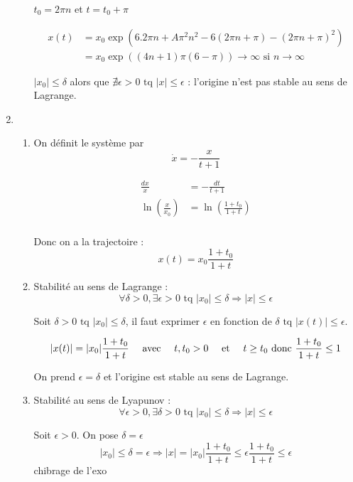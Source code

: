 \documentclass{../../td}{subfiles}
\begin{document}
\begin{enumerate}
\begin{enumerate}
$t_0=2\pi n$ et $t=t_0 + \pi$

\begin{align*}
x(t) & = x_0 \exp(6.2\pi n + A\pi^2 n^2 - 6(2\pi n + \pi) - (2\pi n + \pi)^2) \\
& = x_0\exp((4n+1)\pi(6-\pi)) \to \infty \text{ si } n \to \infty
\end{align*}

$|x_0| \leq \delta$ alors que $\nexists \epsilon > 0 \text{ tq } |x| \leq \epsilon$ : l'origine n'est pas stable au sens de Lagrange.


\end{enumerate}

\item \begin{enumerate}\renewcommand{\theenumi}{\alph{enumi}}\setlength{\itemsep}{8mm}
\item On définit le système par
\[ \dot{x} = -\frac{x}{t+1} \]

\begin{align*}
\frac{dx}{x} & = - \frac{dt}{t+1} \\
\ln(\frac{x}{x_0})  & = \ln(\frac{1+t_0}{1+t}) \\
\end{align*}

Donc on a la trajectoire :
\[ x(t) = x_0 \frac{1+t_0}{1+t} \]

\item Stabilité au sens de Lagrange :
\[ \forall \delta > 0, \exists \epsilon >0 \text{ tq } |x_0| \leq \delta \Rightarrow |x| \leq \epsilon \]

Soit $\delta > 0 \text{ tq } |x_0| \leq \delta$, il faut exprimer $\epsilon$ en fonction de $\delta \text{ tq } |x(t)| \leq \epsilon$.

\[ |x(t)| = |x_0|\frac{1+t_0}{1+t} \quad\text{ avec }\quad t,t_0>0 \quad\text{ et }\quad t\geq t_0 \text{ donc } \frac{1+t_0}{1+t} \leq 1\]

On prend $\epsilon=\delta$ et l'origine est stable au sens de Lagrange.

\item Stabilité au sens de Lyapunov :
\[ \forall \epsilon > 0, \exists \delta >0 \text{ tq } |x_0| \leq \delta \Rightarrow |x| \leq \epsilon \]

Soit $\epsilon>0$. On pose $\delta=\epsilon$
\[ |x_0| \leq \delta=\epsilon \Rightarrow |x| = |x_0|\frac{1+t_0}{1+t} \leq \epsilon \frac{1+t_0}{1+t} \leq \epsilon \] chibrage de l'exo
\end{enumerate}
\end{enumerate}
\end{document}
